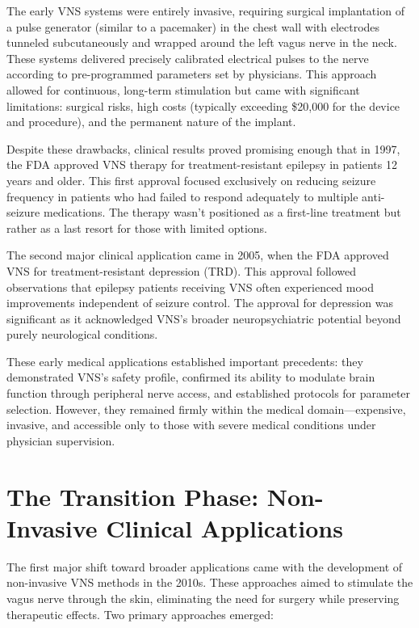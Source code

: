 \documentclass[
  Letterpaper,
]{scrbook}
\begin{document}
The early VNS systems were entirely invasive, requiring surgical
implantation of a pulse generator (similar to a pacemaker) in the chest
wall with electrodes tunneled subcutaneously and wrapped around the left
vagus nerve in the neck. These systems delivered precisely calibrated
electrical pulses to the nerve according to pre-programmed parameters
set by physicians. This approach allowed for continuous, long-term
stimulation but came with significant limitations: surgical risks, high
costs (typically exceeding \$20,000 for the device and procedure), and
the permanent nature of the implant.

Despite these drawbacks, clinical results proved promising enough that
in 1997, the FDA approved VNS therapy for treatment-resistant epilepsy
in patients 12 years and older. This first approval focused exclusively
on reducing seizure frequency in patients who had failed to respond
adequately to multiple anti-seizure medications. The therapy wasn't
positioned as a first-line treatment but rather as a last resort for
those with limited options.

The second major clinical application came in 2005, when the FDA
approved VNS for treatment-resistant depression (TRD). This approval
followed observations that epilepsy patients receiving VNS often
experienced mood improvements independent of seizure control. The
approval for depression was significant as it acknowledged VNS's broader
neuropsychiatric potential beyond purely neurological conditions.

These early medical applications established important precedents: they
demonstrated VNS's safety profile, confirmed its ability to modulate
brain function through peripheral nerve access, and established
protocols for parameter selection. However, they remained firmly within
the medical domain---expensive, invasive, and accessible only to those
with severe medical conditions under physician supervision.

\section{The Transition Phase: Non-Invasive Clinical
Applications}\label{the-transition-phase-non-invasive-clinical-applications}

The first major shift toward broader applications came with the
development of non-invasive VNS methods in the 2010s. These approaches
aimed to stimulate the vagus nerve through the skin, eliminating the
need for surgery while preserving therapeutic effects. Two primary
approaches emerged:
\end{document}

